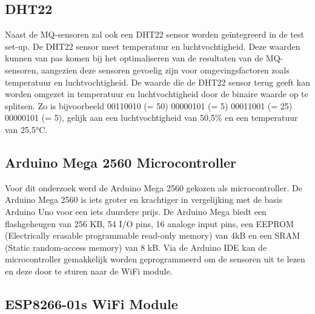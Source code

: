 \subsection{DHT22}%
\label{subsec:dht22}

Naast de MQ-sensoren zal ook een DHT22 sensor worden geïntegreerd in de test set-up. De DHT22 sensor meet temperatuur en luchtvochtigheid. Deze waarden kunnen van pas komen bij het optimaliseren van de resultaten van de MQ-sensoren, aangezien deze sensoren gevoelig zijn voor omgevingsfactoren zoals temperatuur en luchtvochtigheid.
De waarde die de DHT22 sensor terug geeft kan worden omgezet in temperatuur en luchtvochtigheid door de binaire waarde op te splitsen.
Zo is bijvoorbeeld 00110010 (= 50) 00000101 (= 5) 00011001 (= 25) 00000101 (= 5), gelijk aan een luchtvochtigheid van 50,5\% en een temperatuur van 25,5°C.

\subsection{Arduino Mega 2560 Microcontroller}%
\label{subsec:arduino}

Voor dit onderzoek werd de Arduino Mega 2560 gekozen als microcontroller. De Arduino Mega 2560 is iets groter en krachtiger in vergelijking met de basis Arduino Uno voor een iets duurdere prijs. De Arduino Mega biedt een flashgeheugen van 256 KB, 54 I/O pins, 16 analoge input pins, een EEPROM (Electrically erasable programmable read-only memory) van 4kB en een SRAM (Static random-access memory) van 8 kB.
Via de Arduino IDE kan de microcontroller gemakkelijk worden geprogrammeerd om de sensoren uit te lezen en deze door te sturen naar de WiFi module.

\subsection{ESP8266-01s WiFi Module}%
\label{subsec:esp01}

